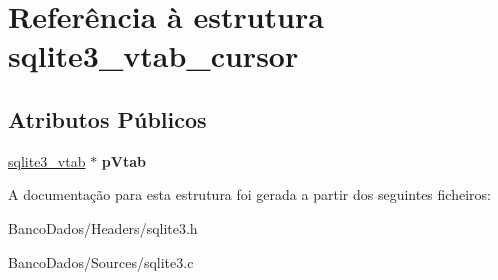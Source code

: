 \hypertarget{structsqlite3__vtab__cursor}{\section{Referência à estrutura sqlite3\-\_\-vtab\-\_\-cursor}
\label{structsqlite3__vtab__cursor}
}
\subsection*{Atributos Públicos}
\begin{DoxyCompactItemize}
\item 
\hypertarget{structsqlite3__vtab__cursor_a7bb57f3f9c7c618a9d6d33c6d9820bdc}{\hyperlink{structsqlite3__vtab}{sqlite3\-\_\-vtab} $\ast$ {\bfseries p\-Vtab}}\label{structsqlite3__vtab__cursor_a7bb57f3f9c7c618a9d6d33c6d9820bdc}

\end{DoxyCompactItemize}


A documentação para esta estrutura foi gerada a partir dos seguintes ficheiros\-:\begin{DoxyCompactItemize}
\item 
Banco\-Dados/\-Headers/sqlite3.\-h\item 
Banco\-Dados/\-Sources/sqlite3.\-c\end{DoxyCompactItemize}
